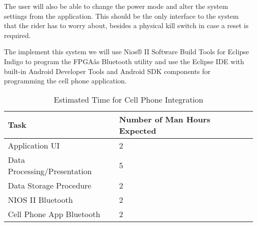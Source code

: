 \documentclass[12pt,article]{IEEEtran}
\begin{document}
            The user will also be able to change the power mode and alter the system settings from the
            application. This should be the only interface to the system that the rider has to worry about,
            besides a physical kill switch in case a reset is required.
            
    	    The implement this system we will use Nios® II Software Build Tools for Eclipse Indigo to program 
            the FPGAâs Bluetooth utility and use the Eclipse IDE with built-in Android Developer Tools and Android 
            SDK components for programming the cell phone application.
    
        \begin{table}[H]        
            \renewcommand{\arraystretch}{1.3}
    			\caption{Estimated Time for Cell Phone Integration}
    			
    			\label{Estimated Time}
    			
    			\centering
    			\begin{tabular}{p{4cm}|p{4cm}}
    			\hline
    			\bfseries 	Task 			        	& \bfseries Number of Man Hours Expected        \\
    			\hline\hline
    						Application UI 		            & 2						    	            \\
    						Data Processing/Presentation    & 5                                         \\
                            Data Storage Procedure    	    & 2			                                \\	
    						NIOS II Bluetooth	            & 2				                            \\	
    						Cell Phone App Bluetooth   	    & 2				                            \\
                            \hline        					
    		    \end{tabular}
    	\end{table}




\end{document}
